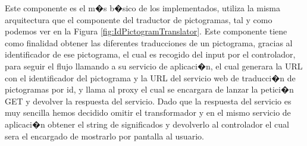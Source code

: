 Este componente es el m�s b�sico de los implementados, utiliza la misma arquitectura que el componente del traductor de pictogramas, tal y como podemos ver en la Figura \ref{fig:IdPictogramTranslator}.
Este componente tiene como finalidad obtener las diferentes traducciones de un pictograma, gracias al identificador de ese pictograma, el cual es recogido del input por el controlador, para seguir el flujo llamando a su servicio de aplicaci�n, el cual generara la URL con el identificador del pictograma y la URL del servicio web de traducci�n de pictogramas por id, y llama al proxy el cual se encargara de lanzar la petici�n GET y devolver la respuesta del servicio. Dado que la respuesta del servicio es muy sencilla hemos decidido omitir el transformador y en el mismo servicio de aplicaci�n obtener el string de significados y devolverlo al controlador el cual sera el encargado de mostrarlo por pantalla al usuario.


